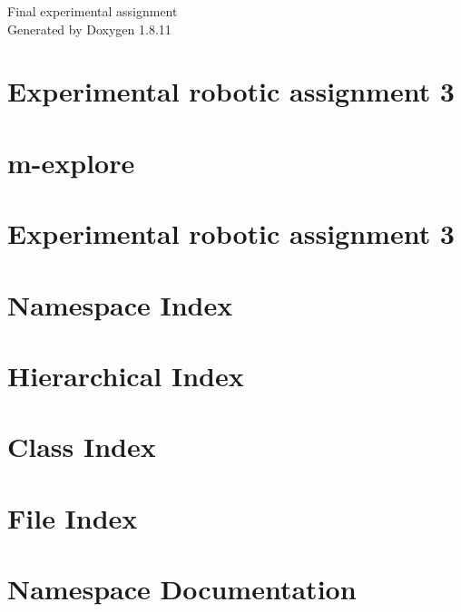 \documentclass[twoside]{book}
\newcommand{\+}{\discretionary{\mbox{\scriptsize$\hookleftarrow$}}{}{}}
\newcommand{\clearemptydoublepage}{%
  \newpage{\pagestyle{empty}\cleardoublepage}%
}
\begin{document}
\hypersetup{pageanchor=false,
             bookmarksnumbered=true,
             pdfencoding=unicode
            }
\begin{titlepage}
\vspace*{7cm}
\begin{center}%
{\Large Final experimental assignment }\\
\vspace*{1cm}
{\large Generated by Doxygen 1.8.11}\\
\end{center}
\end{titlepage}
\clearemptydoublepage
\tableofcontents
\clearemptydoublepage
{}
\hypersetup{pageanchor=true}

\chapter{Experimental robotic assignment 3}
\label{index}\hypertarget{index}{}
\chapter{m-\/explore}
\label{md_m-explore_readme_explore}
\hypertarget{md_m-explore_readme_explore}{}

\chapter{Experimental robotic assignment 3}
\label{md_Output_README_DOXY}
\hypertarget{md_Output_README_DOXY}{}

\chapter{Namespace Index}

\chapter{Hierarchical Index}

\chapter{Class Index}

\chapter{File Index}

\chapter{Namespace Documentation}










\end{document}
